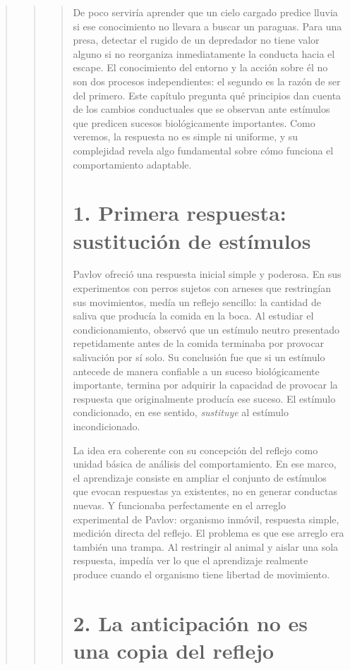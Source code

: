 \documentclass[
  letterpaper,
  DIV=11,
  numbers=noendperiod]{scrreprt}
\begin{document}
\begin{tcolorbox}[enhanced jigsaw, toprule=.15mm, arc=.35mm, colback=white, opacityback=0, colframe=quarto-callout-note-color-frame, breakable, rightrule=.15mm, left=2mm, leftrule=.75mm, bottomrule=.15mm]
\begin{quote}
\begin{quote}
\begin{quote}
De poco serviría aprender que un cielo cargado predice lluvia si ese
conocimiento no llevara a buscar un paraguas. Para una presa, detectar
el rugido de un depredador no tiene valor alguno si no reorganiza
inmediatamente la conducta hacia el escape. El conocimiento del entorno
y la acción sobre él no son dos procesos independientes: el segundo es
la razón de ser del primero. Este capítulo pregunta qué principios dan
cuenta de los cambios conductuales que se observan ante estímulos que
predicen sucesos biológicamente importantes. Como veremos, la respuesta
no es simple ni uniforme, y su complejidad revela algo fundamental sobre
cómo funciona el comportamiento adaptable.

\section{1. Primera respuesta: sustitución de
estímulos}\label{primera-respuesta-sustituciuxf3n-de-estuxedmulos}

Pavlov ofreció una respuesta inicial simple y poderosa. En sus
experimentos con perros sujetos con arneses que restringían sus
movimientos, medía un reflejo sencillo: la cantidad de saliva que
producía la comida en la boca. Al estudiar el condicionamiento, observó
que un estímulo neutro presentado repetidamente antes de la comida
terminaba por provocar salivación por sí solo. Su conclusión fue que si
un estímulo antecede de manera confiable a un suceso biológicamente
importante, termina por adquirir la capacidad de provocar la respuesta
que originalmente producía ese suceso. El estímulo condicionado, en ese
sentido, \emph{sustituye} al estímulo incondicionado.

La idea era coherente con su concepción del reflejo como unidad básica
de análisis del comportamiento. En ese marco, el aprendizaje consiste en
ampliar el conjunto de estímulos que evocan respuestas ya existentes, no
en generar conductas nuevas. Y funcionaba perfectamente en el arreglo
experimental de Pavlov: organismo inmóvil, respuesta simple, medición
directa del reflejo. El problema es que ese arreglo era también una
trampa. Al restringir al animal y aislar una sola respuesta, impedía ver
lo que el aprendizaje realmente produce cuando el organismo tiene
libertad de movimiento.

\section{2. La anticipación no es una copia del
reflejo}\label{la-anticipaciuxf3n-no-es-una-copia-del-reflejo}


\end{quote}
\end{quote}
\end{quote}
\end{tcolorbox}
\end{document}
